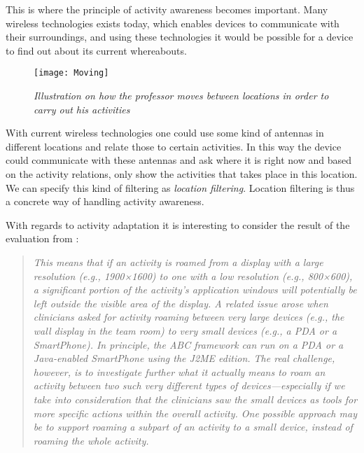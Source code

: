 This is where the principle of activity awareness becomes important. Many wireless technologies exists today, which enables devices to communicate with their surroundings, and using these technologies it would be possible for a device to find out about its current whereabouts.

\begin{figure}[h!]
  \centering
    \texttt{[image: Moving]}
  \caption{\emph{Illustration on how the professor moves between locations in order to carry out his activities}}
  \label{fig:locationmovement}
\end{figure}

With current wireless technologies one could use some kind of antennas in different locations and relate those to certain activities. In this way the device could communicate with these antennas and ask where it is right now and based on the activity relations, only show the activities that takes place in this location. We can specify this kind of filtering as \emph{location filtering}. Location filtering is thus a concrete way of handling activity awareness.

With regards to activity adaptation it is interesting to consider the result of the evaluation from \citet{bardram2009}:
\begin{quotation}
	\emph{
		This means that if an activity is roamed from a display with a large resolution (e.g., 1900×1600) to one with a low resolution (e.g., 800×600), a significant portion of the activity’s application windows will potentially be left outside the visible area of the display. A related issue arose when clinicians asked for activity roaming between very large devices (e.g., the wall display in the team room) to very small devices (e.g., a PDA or a SmartPhone). In principle, the ABC framework can run on a PDA or a Java-enabled SmartPhone using the J2ME edition. The real challenge, however, is to investigate further what it actually means to roam an activity between two such very different types of devices—especially if we take into consideration that the clinicians saw the small devices as tools for more specific actions within the overall activity. One possible approach may be to support roaming a subpart of an activity to a small device, instead of roaming the whole activity.
	}
\end{quotation}

